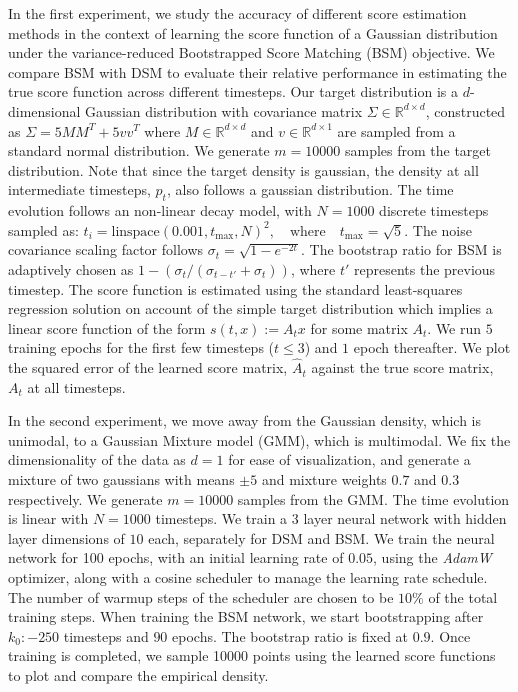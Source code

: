 In the first experiment, we study the accuracy of different score estimation methods in the context of learning the score function of a Gaussian distribution under the variance-reduced Bootstrapped Score Matching (BSM) objective. We compare BSM with DSM to evaluate their relative performance in estimating the true score function across different timesteps. Our target distribution is a $d$-dimensional Gaussian distribution with covariance matrix $\Sigma \in \mathbb{R}^{d \times d}$, constructed as $\Sigma = 5 M M^T + 5 v v^T$ where $M \in \mathbb{R}^{d \times d}$ and $v \in \mathbb{R}^{d \times 1}$ are sampled from a standard normal distribution. We generate $m = 10000$ samples from the target distribution. Note that since the target density is gaussian, the density at all intermediate timesteps, $p_{t}$, also follows a gaussian distribution. The time evolution follows an non-linear decay model, with $N = 1000$ discrete timesteps sampled as:
$t_i = \text{linspace}(0.001, t_{\max}, N)^2, \quad \text{where} \quad t_{\max} = \sqrt{5}$. The noise covariance scaling factor follows $\sigma_t = \sqrt{1 - e^{-2t}}$. The bootstrap ratio for BSM is adaptively chosen as $1 - (\sigma_t / (\sigma_{t-t'} + \sigma_t))$, where $t'$ represents the previous timestep. The score function is estimated using the standard least-squares regression solution on account of the simple target distribution which implies a linear score function of the form $s(t, x) := A_{t}x$ for some matrix $A_{t}$. We run $5$ training epochs for the first few timesteps ($t \leq 3$) and $1$ epoch thereafter. We plot the squared error of the learned score matrix, $\hat{A}_{t}$ against the true score matrix, $A_{t}$ at all timesteps. 

In the second experiment, we move away from the Gaussian density, which is unimodal, to a Gaussian Mixture model (GMM), which is multimodal. We fix the dimensionality of the data as $d = 1$ for ease of visualization, and generate a mixture of two gaussians with means $\pm 5$ and mixture weights $0.7$ and $0.3$ respectively. We generate $m=10000$ samples from the GMM.  The time evolution is linear with $N=1000$ timesteps. We train a 3 layer neural network with hidden layer dimensions of $10$ each, separately for DSM and BSM. We train the neural network for 100 epochs, with an initial learning rate of $0.05$, using the \textit{AdamW} optimizer, along with a cosine scheduler to manage the learning rate schedule. The number of warmup steps of the scheduler are chosen to be $10\%$ of the total training steps. When training the BSM network, we start bootstrapping after $k_0 :- 250$ timesteps and $90$ epochs. The bootstrap ratio is fixed at $0.9$. Once training is completed, we sample 10000 points using the learned score functions to plot and compare the empirical density. 


